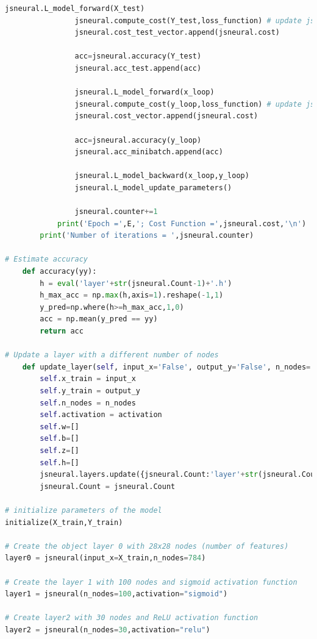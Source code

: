 \documentclass{article}
\begin{document}
\begin{lstlisting}[language=Python]
                jsneural.L_model_forward(X_test)
                jsneural.compute_cost(Y_test,loss_function) # update jsneural.cost with test data
                jsneural.cost_test_vector.append(jsneural.cost)
                
                acc=jsneural.accuracy(Y_test)
                jsneural.acc_test.append(acc)
                
                jsneural.L_model_forward(x_loop)
                jsneural.compute_cost(y_loop,loss_function) # update jsneural.cost with mini-batch
                jsneural.cost_vector.append(jsneural.cost)
                
                acc=jsneural.accuracy(y_loop)
                jsneural.acc_minibatch.append(acc)
                
                jsneural.L_model_backward(x_loop,y_loop)
                jsneural.L_model_update_parameters()
                
                jsneural.counter+=1
            print('Epoch =',E,'; Cost Function =',jsneural.cost,'\n')
        print('Number of iterations = ',jsneural.counter)

# Estimate accuracy        
    def accuracy(yy):
        h = eval('layer'+str(jsneural.Count-1)+'.h')
        h_max_acc = np.max(h,axis=1).reshape(-1,1)
        y_pred=np.where(h>=h_max_acc,1,0)
        acc = np.mean(y_pred == yy)
        return acc

# Update a layer with a different number of nodes
    def update_layer(self, input_x='False', output_y='False', n_nodes='False', activation='False'):
        self.x_train = input_x
        self.y_train = output_y
        self.n_nodes = n_nodes
        self.activation = activation
        self.w=[]
        self.b=[]
        self.z=[]
        self.h=[]
        jsneural.layers.update({jsneural.Count:'layer'+str(jsneural.Count)}) # Create dictionary for each layer
        jsneural.Count = jsneural.Count

# initialize parameters of the model
initialize(X_train,Y_train)

# Create the object layer 0 with 28x28 nodes (number of features)
layer0 = jsneural(input_x=X_train,n_nodes=784) 

# Create the layer 1 with 100 nodes and sigmoid activation function
layer1 = jsneural(n_nodes=100,activation="sigmoid")

# Create layer2 with 30 nodes and ReLU activation function
layer2 = jsneural(n_nodes=30,activation="relu")


\end{lstlisting}
\end{document}
